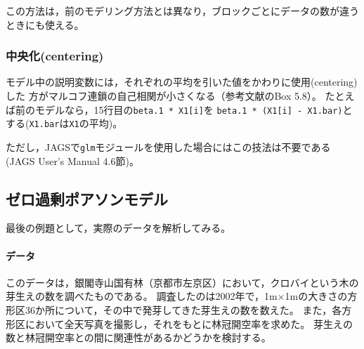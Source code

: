 \documentclass[11pt,uplatex]{jsarticle}
\begin{document}
この方法は，前のモデリング方法とは異なり，ブロックごとにデータの数が違うときにも使える。

\subsubsection*{中央化(centering)}

モデル中の説明変数には，それぞれの平均を引いた値をかわりに使用(centering)した
方がマルコフ連鎖の自己相関が小さくなる（参考文献\cite{McCarthy}のBox 5.8）。
たとえば前のモデルなら，15行目の\texttt{beta.1 * X1[i]}を
\texttt{beta.1 * (X1[i] - X1.bar)}とする(\texttt{X1.bar}は\texttt{X1}の平均)。

ただし，\textsf{JAGS}で\texttt{glm}モジュールを使用した場合にはこの技法は不要である
(JAGS User's Manual\cite{JAGS} 4.6節)。


%
%

\subsection{ゼロ過剰ポアソンモデル}
\label{path}

最後の例題として，実際のデータを解析してみる。

\paragraph{データ}
このデータは，銀閣寺山国有林（京都市左京区）において，クロバイという木の芽生えの数を調べたものである。
調査したのは2002年で，1m×1mの大きさの方形区36か所について，その中で発芽してきた芽生えの数を数えた。
また，各方形区において全天写真を撮影し，それをもとに林冠開空率を求めた。
芽生えの数と林冠開空率との間に関連性があるかどうかを検討する。
\end{document}
